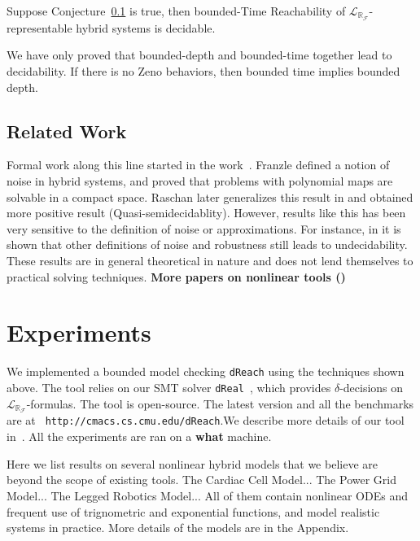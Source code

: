 \documentclass[envcountsect]{llncs}
\newcommand{\lrf}{\mathcal{L}_{\mathbb{R}_{\mathcal{F}}}}
\begin{document}
\begin{proposition}
Suppose Conjecture~\ref{} is true, then bounded-Time Reachability of
$\lrf$-representable hybrid systems is decidable.
\end{proposition}
We have only proved that bounded-depth and bounded-time together lead to
decidability. If there is no Zeno behaviors, then bounded time implies bounded
depth.


\subsection{Related Work}
Formal work along this line started in the work~\cite{}.
Franzle defined a notion of noise in hybrid systems, and proved that problems
with polynomial maps are solvable in a compact space. Raschan later generalizes
this result in \cite{} and obtained more positive result
(Quasi-semidecidablity). However, results like this has been very sensitive to
the definition of noise or approximations. For instance, in \cite{} it is shown
that other definitions of noise and robustness still leads to undecidability.
These results are in general theoretical in nature and does not lend themselves
to practical solving techniques. {\bf More papers on nonlinear tools ()}

\section{Experiments}\label{experiments}

We implemented a bounded model checking {\tt dReach} using the
techniques shown above. The tool relies on our SMT solver {\tt dReal}~\cite{},
which provides $\delta$-decisions on $\lrf$-formulas. The tool is
open-source. The latest version and all the benchmarks are at {\tt
http://cmacs.cs.cmu.edu/dReach}.We describe more details of our tool in~\cite{}.
All the experiments are ran on a {\bf what} machine. 

Here we list results on several nonlinear hybrid models that we believe are
beyond the scope of existing tools.
The {\sf Cardiac Cell Model}... The {\sf Power Grid Model}... The {\sf Legged
Robotics Model}... All of them contain nonlinear ODEs and frequent use of
trignometric and exponential functions, and model realistic systems in practice.
More details of the models are in the Appendix. 
\end{document}
